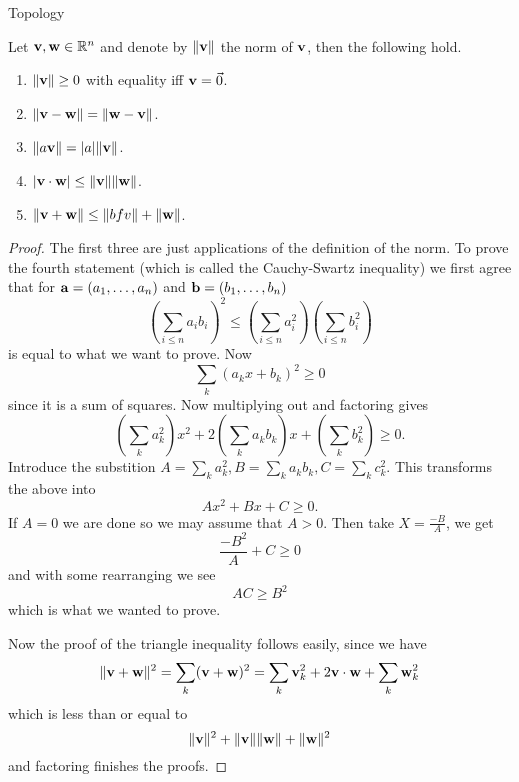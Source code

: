 \begin{chapter}{Topology}
    \begin{thm}
        Let $\mathbf{v}, \mathbf{w} \in \mathbb{R}^{n}$ and denote by  $\|\mathbf{v}\|$ the norm of $\mathbf{v}$, then the following hold. 
        \begin{enumerate}
            \item $\norm{\bfv} \geq 0$ with equality iff $\mathbf{v} = \vec{0}$.
            \item $\| \mathbf{v} - \mathbf{w} \| = \| \mathbf{w} - \mathbf{v} \|$.
            \item $\| a\mathbf{v} \| = |a| \| \mathbf{v} \|$.
            \item $|\mathbf{v} \cdot \mathbf{w} | \leq \|\mathbf{v} \| \|\mathbf{w} \|$. 
            \item $\|\mathbf{v} + \mathbf{w} \| \leq \|bfv\| + \| \mathbf{w} \|$. 
        \end{enumerate}


    \end{thm}


    \begin{proof}
        The first three are just applications of the definition of the norm. 
        To prove the fourth statement (which is called the Cauchy-Swartz inequality) we first agree that for 
        $\mathbf{a} = (a_1, \dots, a_n)$ and $\mathbf{b} = (b_1, \dots, b_n)$
        \begin{equation}
            \left(\sum_{i\leq n} a_ib_i \right)^2 \leq \left(\sum_{i \leq n} a^2_i \right) \left(\sum_{i \leq n}b^2_i \right)
        \end{equation}
        is equal to what we want to prove. Now 
        \[\sum_k (a_kx + b_k)^2 \geq 0\]
        since it is a sum of squares. Now multiplying out and factoring gives 
        \[\left(\sum_k a_k^2\right)x^2 + 2\left(\sum_k a_kb_k\right)x + \left(\sum_k b^2_k\right) \geq 0.\]
        Introduce the substition $A = \sum_k a_k^2, B = \sum_k a_kb_k, C = \sum_k c^2_k$. This transforms the above into 
        \[Ax^2 + Bx + C \geq 0.\]
        If $A = 0$ we are done so we may assume that $A > 0$. Then take $X = \frac{-B}{A}$, we get 
        \[\frac{-B^2}{A} + C \geq 0\]
        and with some rearranging we see 
        \[AC \geq B^2\]
        which is what we wanted to prove. 

        Now the proof of the triangle inequality follows easily, since we have 
        \[\| \mathbf{v} + \mathbf{w} \|^2 = \sum_k (\mathbf{v} + \mathbf{w})^2 = \sum_k \mathbf{v}^2_k + 2 \mathbf{v} \cdot \mathbf{w} + \sum_k \mathbf{w}^2_k\]
        which is less than or equal to 
        \[\|\mathbf{v} \|^2 + \| \mathbf{v} \| \|\mathbf{w}\| + \|\mathbf{w}\|^2\]
        and factoring finishes the proofs. 
    \end{proof}
\end{chapter}